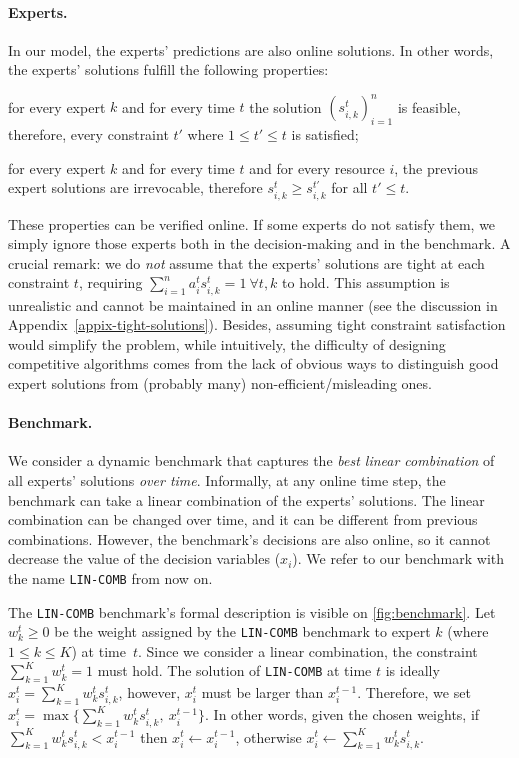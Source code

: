\paragraph{Experts.} \label{subsec:experts} In our model, the experts' predictions are also online solutions. In other words, the experts' solutions
fulfill the following properties:
\begin{compactenum}
	\item for every expert $k$ and for every time $t$ the solution $(s_{i,k}^{t})_{i=1}^{n}$ is feasible, therefore, every constraint $t'$ where $1 \leq t' \leq t$ is satisfied;
	\item for every expert $k$ and for every time $t$ and for every resource $i$, the previous expert solutions are irrevocable, therefore $s_{i,k}^{t} \geq s_{i,k}^{t'}$ for all $t' \leq t$.
\end{compactenum}
These properties can be verified online. If some experts do not satisfy them, we simply ignore those experts both in the decision-making and in the benchmark.
A crucial remark: we do \emph{not} assume that the experts' solutions are tight at each constraint $t$, requiring $\sum_{i=1}^{n} a_{i}^{t} s_{i,k}^{t} = 1 ~ \forall t, k$ to hold.
This assumption is unrealistic and cannot be maintained in an online manner (see the discussion in Appendix~\ref{appix-tight-solutions}).
Besides, assuming tight constraint satisfaction would simplify the problem, while intuitively,
the difficulty of designing competitive algorithms comes from the lack of obvious ways to distinguish
good expert solutions from (probably many) non-efficient/misleading ones.

\paragraph{Benchmark.}
We consider a dynamic benchmark that captures the \emph{best linear combination} of all experts' solutions \emph{over time}.
Informally, at any online time step, the benchmark can take a linear combination of the experts' solutions.
The linear combination can be changed over time, and it can be different from previous combinations.
However, the benchmark's decisions are also online, so it cannot decrease the value of the decision variables ($x_{i}$).
We refer to our benchmark with the name \texttt{LIN-COMB} from now on.

The \texttt{LIN-COMB} benchmark's formal description is visible on \cref{fig:benchmark}.
Let $w_{k}^{t} \geq 0$ be the weight assigned by the \texttt{LIN-COMB} benchmark to expert $k$ (where $1 \leq k \leq K$) at time~$t$.
Since we consider a linear combination, the constraint $ \sum_{k=1}^{K} w_{k}^{t} = 1$ must hold.
The solution of \texttt{LIN-COMB} at time $t$ is ideally $x_{i}^{t} = \sum_{k=1}^{K} w_{k}^{t} s_{i,k}^{t}$,
however, $x_{i}^{t}$ must be larger than $x_{i}^{t-1}$.
Therefore, we set $x_{i}^{t} = \max\bigl\{\sum_{k=1}^{K} w_{k}^{t} s_{i,k}^{t},\ x_{i}^{t-1}\bigr\}$.
In other words, given the chosen weights, if  $\sum_{k=1}^{K} w_{k}^{t} s_{i,k}^{t} < x_{i}^{t-1}$ then $x_{i}^{t} \gets x_{i}^{t-1}$,
otherwise $x_{i}^{t} \gets \sum_{k=1}^{K} w_{k}^{t} s_{i,k}^{t}$.

